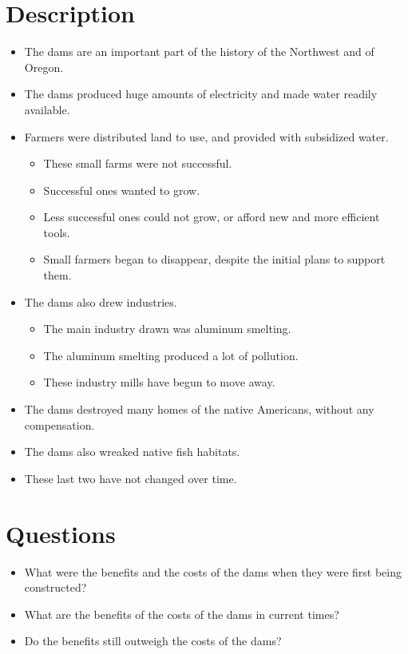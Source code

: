 \documentclass[12pt]{article}
\begin{document}
\section{Description}
\begin{itemize}
  \item The dams are an important part of the history of the Northwest and of Oregon.
  \item The dams produced huge amounts of electricity and made water readily available.
  \item Farmers were distributed land to use, and provided with subsidized water.
    \begin{itemize}
      \item These small farms were not successful.
      \item Successful ones wanted to grow.
      \item Less successful ones could not grow, or afford new and more efficient tools.
      \item Small farmers began to disappear, despite the initial plans to support them.
    \end{itemize}
  \item The dams also drew industries.
    \begin{itemize}
      \item The main industry drawn was aluminum smelting.
      \item The aluminum smelting produced a lot of pollution.
      \item These industry mills have begun to move away.
    \end{itemize}
  \item The dams destroyed many homes of the native Americans, without any compensation.
  \item The dams also wreaked native fish habitats.
  \item These last two have not changed over time.
\end{itemize}
\section{Questions}
\begin{itemize}
  \item What were the benefits and the costs of the dams when they were first being constructed?
  \item What are the benefits of the costs of the dams in current times?
  \item Do the benefits still outweigh the costs of the dams?
\end{itemize}
\end{document}
